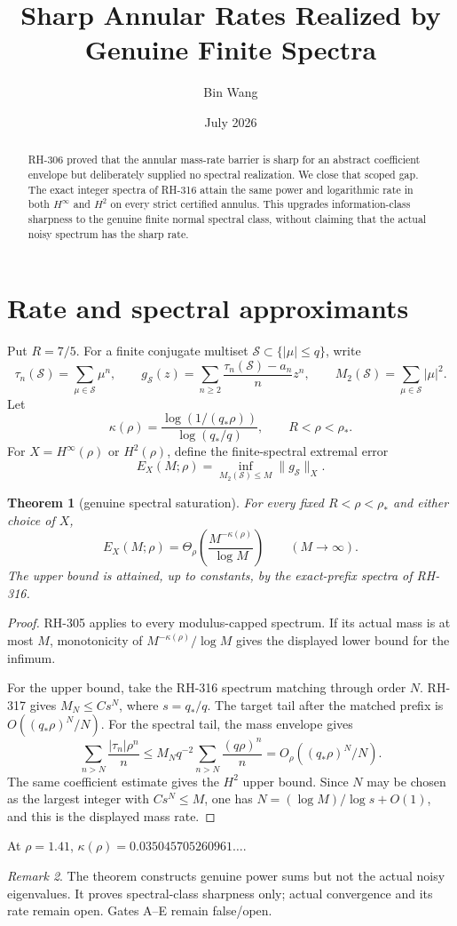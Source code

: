 \documentclass[11pt]{article}
\title{Sharp Annular Rates Realized by Genuine Finite Spectra}
\author{Bin Wang}\date{July 2026}
\newtheorem{theorem}{Theorem}[section]
\theoremstyle{remark}\newtheorem{remark}[theorem]{Remark}
\begin{document}
\maketitle
\begin{abstract}
RH-306 proved that the annular mass-rate barrier is sharp for an abstract
coefficient envelope but deliberately supplied no spectral realization.  We
close that scoped gap.  The exact integer spectra of RH-316 attain the same
power and logarithmic rate in both $H^\infty$ and $H^2$ on every strict
certified annulus.  This upgrades information-class sharpness to the genuine
finite normal spectral class, without claiming that the actual noisy spectrum
has the sharp rate.
\end{abstract}

\section{Rate and spectral approximants}
Put $R=7/5$.  For a finite conjugate multiset $\mathcal S\subset
\{|\mu|\le q\}$, write
\[
 \tau_n(\mathcal S)=\sum_{\mu\in\mathcal S}\mu^n,
 \qquad
 g_{\mathcal S}(z)=\sum_{n\ge2}
 \frac{\tau_n(\mathcal S)-a_n}{n}z^n,
 \qquad
 M_2(\mathcal S)=\sum_{\mu\in\mathcal S}|\mu|^2.
\]
Let
\[
 \kappa(\rho)=
 \frac{\log(1/(q_*\rho))}{\log(q_*/q)},
 \qquad R<\rho<\rho_*.
\]
For $X=H^\infty(\rho)$ or $H^2(\rho)$, define the finite-spectral extremal
error
\[
 E_X(M;\rho)=\inf_{M_2(\mathcal S)\le M}\|g_{\mathcal S}\|_X.
\]

\begin{theorem}[genuine spectral saturation]
For every fixed $R<\rho<\rho_*$ and either choice of $X$,
\[
 E_X(M;\rho)=\Theta_\rho\left(
 \frac{M^{-\kappa(\rho)}}{\log M}
 \right)\qquad(M\to\infty).
\]
The upper bound is attained, up to constants, by the exact-prefix spectra of
RH-316.
\end{theorem}
\begin{proof}
RH-305 applies to every modulus-capped spectrum.  If its actual mass is at
most $M$, monotonicity of
$M^{-\kappa(\rho)}/\log M$ gives the displayed lower bound for the infimum.

For the upper bound, take the RH-316 spectrum matching through order $N$.
RH-317 gives $M_N\le Cs^N$, where $s=q_*/q$.  The target tail after the
matched prefix is
$O((q_*\rho)^N/N)$.  For the spectral tail, the mass envelope gives
\[
 \sum_{n>N}\frac{|\tau_n|\rho^n}{n}
 \le M_Nq^{-2}\sum_{n>N}\frac{(q\rho)^n}{n}
 =O_\rho((q_*\rho)^N/N).
\]
The same coefficient estimate gives the $H^2$ upper bound.  Since
$N$ may be chosen as the largest integer with $Cs^N\le M$, one has
$N=(\log M)/\log s+O(1)$, and this is the displayed mass rate.
\end{proof}

At $\rho=1.41$, $\kappa(\rho)=0.035045705260961\ldots$.

\begin{remark}
The theorem constructs genuine power sums but not the actual noisy
eigenvalues.  It proves spectral-class sharpness only; actual convergence and
its rate remain open.  Gates A--E remain false/open.
\end{remark}
\end{document}
